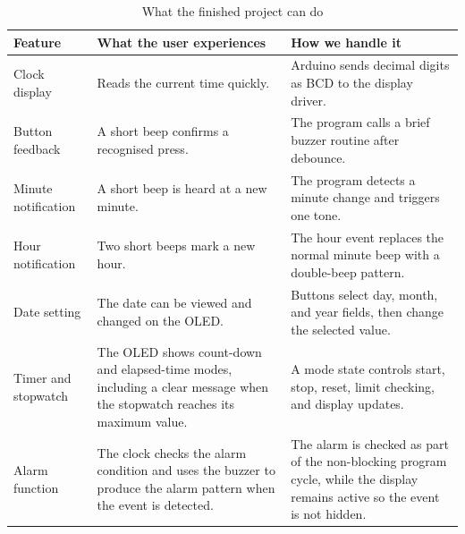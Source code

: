 \documentclass[12pt,letterpaper]{article}
\begin{document}
\begin{table}[H]

  \centering

  \caption{What the finished project can do}

  \label{tab:features}

  \begin{tabularx}{
    \textwidth
  }{
    @{}p{34mm}Y Y@{}
  }

    \toprule

    \textbf{Feature}
    &
    \textbf{What the user experiences}
    &
    \textbf{How we handle it}
    \\

    \midrule

    Clock display
    &
    Reads the current time quickly.
    &
    Arduino sends decimal digits as BCD
    to the display driver.
    \\

    Button feedback
    &
    A short beep confirms a recognised press.
    &
    The program calls a brief buzzer routine
    after debounce.
    \\

    Minute notification
    &
    A short beep is heard at a new minute.
    &
    The program detects a minute change
    and triggers one tone.
    \\

    Hour notification
    &
    Two short beeps mark a new hour.
    &
    The hour event replaces the normal
    minute beep with a double-beep pattern.
    \\

    Date setting
    &
    The date can be viewed and changed on the OLED.
    &
    Buttons select day, month, and year fields,
    then change the selected value.
    \\

    Timer and stopwatch
    &
    The OLED shows count-down and elapsed-time modes, including
    a clear message when the stopwatch reaches its maximum value.
    &
    A mode state controls start, stop,
    reset, limit checking, and display updates.
    \\

    Alarm function
    &
    The clock checks the alarm condition and uses the buzzer
    to produce the alarm pattern when the event is detected.
    &
    The alarm is checked as part of the non-blocking program cycle,
    while the display remains active so the event is not hidden.
    \\


\end{tabularx}
\end{table}
\end{document}
